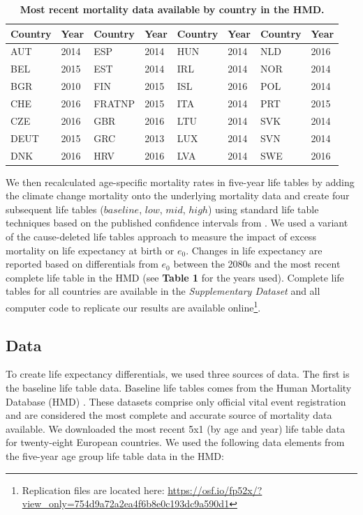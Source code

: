 \documentclass[12pt,]{article}
\begin{document}
\begin{table}
\caption{\textbf{Most recent mortality data available by country in the HMD.}} \label{Table2}
\begin{tabular}{ll|ll|ll|ll}
Country & Year & Country & Year & Country & Year & Country & Year \\
\hline
AUT     & 2014 & ESP     & 2014 & HUN     & 2014 & NLD     & 2016 \\
BEL     & 2015 & EST     & 2014 & IRL     & 2014 & NOR     & 2014 \\
BGR     & 2010 & FIN     & 2015 & ISL     & 2016 & POL     & 2014 \\
CHE     & 2016 & FRATNP  & 2015 & ITA     & 2014 & PRT     & 2015 \\
CZE     & 2016 & GBR     & 2016 & LTU     & 2014 & SVK     & 2014 \\
DEUT    & 2015 & GRC     & 2013 & LUX     & 2014 & SVN     & 2014 \\
DNK     & 2016 & HRV     & 2016 & LVA     & 2014 & SWE     & 2016 \\
\hline
\end{tabular}
\end{table}

We then recalculated age-specific mortality rates in five-year life
tables by adding the climate change mortality onto the underlying
mortality data and create four subsequent life tables (\(baseline\),
\(low\), \(mid\), \(high\)) using standard life table techniques
\citep{wunsch2013life} based on the published confidence intervals from
\citep{forzieri2017increasing}. We used a variant of the cause-deleted
life tables approach
\citep{brand2005approximations, beltran2008integrated} to measure the
impact of excess mortality on life expectancy at birth or \(e_0\).
Changes in life expectancy are reported based on differentials from
\(e_0\) between the 2080s and the most recent complete life table in the
HMD (see \textbf{Table 1} for the years used). Complete life tables for
all countries are available in the \emph{Supplementary Dataset} and all
computer code to replicate our results are available online\footnote{Replication
  files are located here:
  \url{https://osf.io/fp52x/?view_only=754d9a72a2ea4f6b8e0c193dc9a590d1}}.

\hypertarget{data}{%
\subsection{Data}\label{data}}

To create life expectancy differentials, we used three sources of data.
The first is the baseline life table data. Baseline life tables comes
from the Human Mortality Database (HMD) \citep{HMD}. These datasets
comprise only official vital event registration and are considered the
most complete and accurate source of mortality data available. We
downloaded the most recent 5x1 (by age and year) life table data for
twenty-eight European countries. We used the following data elements
from the five-year age group life table data in the HMD:
\end{document}

